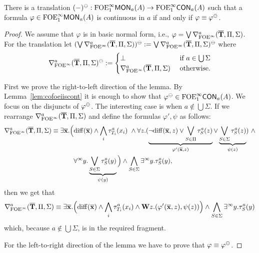\begin{lemma}\label{lem:ofoeictrans}
	There is a translation $(-)^\tcont:\monot{\ofoei}{a}(A) \to \cont{\ofoei}{a}(A)$ such that
a formula $\varphi \in \monot{\ofoei}{a}(A)$ is continuous in $a$ if and only if $\varphi\equiv \varphi^\tcont$.
\end{lemma}
\begin{proof} We assume that $\varphi$ is in basic normal form, i.e., $\varphi = \bigvee \mondbnfofoei{\vlist{T}}{\Pi}{\Sigma}{a}$.
For the translation let $(\bigvee \mondbnfofoei{\vlist{T}}{\Pi}{\Sigma}{a})^\tcont := \bigvee \mondbnfofoei{\vlist{T}}{\Pi}{\Sigma}{a}^\tcont$ where
\[
\mondbnfofoei{\vlist{T}}{\Pi}{\Sigma}{a}^\tcont :=
\begin{cases}
	\bot &\text{ if } a\in \bigcup \Sigma\\
	\mondbnfofoei{\vlist{T}}{\Pi}{\Sigma}{a} &\text{ otherwise}.
\end{cases}
\]

First we prove the right-to-left direction of the lemma. By Lemma~\ref{lem:cofoeiiscont} it is enough to show that $\varphi^\tcont \in \cont{\ofoei}{a}(A)$. We focus on the disjuncts of $\varphi^\tcont$. The interesting case is when $a\notin \bigcup \Sigma$. If we rearrange $\mondbnfofoei{\vlist{T}}{\Pi}{\Sigma}{a}$ and define the formulas $\varphi', \psi$ as follows:
%
\begin{align*}
\mondbnfofoei{\vlist{T}}{\Pi}{\Sigma}{a} \equiv \exists \vlist{x}.\Big(& \arediff{\vlist{x}} \land \bigwedge_i \tau^a_{T_i}(x_i)\ \land \forall z.(\underbrace{\lnot\arediff{\vlist{x},z} \lor \bigvee_{S\in \Pi} \tau^a_S(z)}_{\varphi'(\vlist{x},z)} \lor \underbrace{\bigvee_{S\in \Sigma} \tau^a_S(z)}_{\psi(z)})\ \land \\
& \dqu y.\underbrace{\bigvee_{S\in\Sigma} \tau^a_S(y)}_{\psi(y)} \Big) \land \bigwedge_{S\in\Sigma} \qu y.\tau^a_S(y),
\end{align*}
%
then we get that
{\small
\[
\mondbnfofoei{\vlist{T}}{\Pi}{\Sigma}{a} \equiv \exists \vlist{x}.\Big(\arediff{\vlist{x}} \land \bigwedge_i \tau^a_{T_i}(x_i) \land \wqu z.(\varphi'(\vlist{x},z),\psi(z)) \Big) \land \bigwedge_{S\in\Sigma} \qu y.\tau^a_S(y)
\]}
%
which, because $a\notin \bigcup \Sigma$, is in the required fragment.

For the left-to-right direction of the lemma we have to prove that $\varphi \equiv \varphi^\tcont$.


\end{proof}
